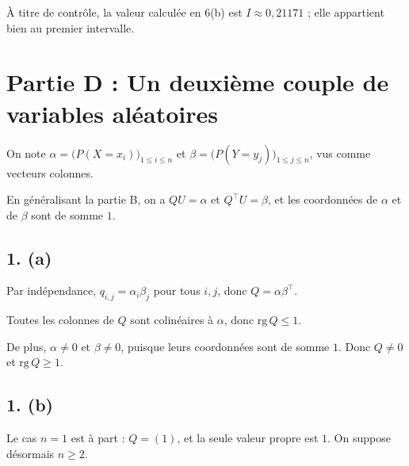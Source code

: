 \documentclass[11pt,a4paper]{article}
\newcommand{\equationajustee}[1]{%
  \sbox{\boiteequation}{$\displaystyle #1$}%
  \ifdim\wd\boiteequation>\linewidth
    \[\resizebox{\linewidth}{!}{\usebox{\boiteequation}}\]%
  \else
    \[#1\]%
  \fi}
\begin{document}
À titre de contrôle, la valeur calculée en 6(b) est \(I\approx0{,}21171\) ; elle appartient bien au premier intervalle.

\hypertarget{partie-d-un-deuxiuxe8me-couple-de-variables-aluxe9atoires}{%
\section{Partie D : Un deuxième couple de variables aléatoires}\label{partie-d-un-deuxiuxe8me-couple-de-variables-aluxe9atoires}}

On note \(\alpha=\big(P(X=x_i)\big)_{1\le i\le n}\) et \(\beta=\big(P(Y=y_j)\big)_{1\le j\le n}\), vus comme vecteurs colonnes.

En généralisant la partie B, on a \(QU=\alpha\) et \(Q^\top U=\beta\), et les coordonnées de \(\alpha\) et de \(\beta\) sont de somme \(1\).

\hypertarget{a-8}{%
\subsection{1. (a)}\label{a-8}}

Par indépendance, \(q_{i,j}=\alpha_i\beta_j\) pour tous \(i,j\), donc \(Q=\alpha\beta^\top\).

Toutes les colonnes de \(Q\) sont colinéaires à \(\alpha\), donc \(\mathrm{rg}\,Q\leqslant1\).

De plus, \(\alpha\neq0\) et \(\beta\neq0\), puisque leurs coordonnées sont de somme \(1\). Donc \(Q\neq0\) et \(\mathrm{rg}\,Q\geqslant1\).

\equationajustee{\boxed{\mathrm{rg}\,Q=1}}

\hypertarget{b-8}{%
\subsection{1. (b)}\label{b-8}}

Le cas \(n=1\) est à part : \(Q=(1)\), et la seule valeur propre est \(1\). On suppose désormais \(n\geqslant2\).
\end{document}

